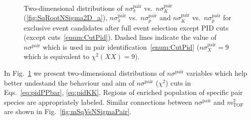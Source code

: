 \begin{figure}[h]
{  \begin{subfigure}[b]{\linewidth}\addtocounter{subfigure}{-2}\vspace*{-13pt}
  \end{subfigure}\\
  \begin{minipage}[t][1.042\linewidth][t]{\linewidth}\vspace{10pt}
    \caption[$n\sigma^{\text{pair}}_{X}$ vs. $n\sigma^{\text{pair}}_{Y}$.]{Two-dimensional distributions of $n\sigma^{\text{pair}}_{\pi}$ vs.~$n\sigma^{\text{pair}}_{K}$ (\ref{fig:SqRootNSigma2D_a}), $n\sigma^{\text{pair}}_{\pi}$ vs.~$n\sigma^{\text{pair}}_{p}$ and $n\sigma^{\text{pair}}_{K}$ vs.~$n\sigma^{\text{pair}}_{p}$ for exclusive event candidates after full event selection except PID cuts (except cuts~\ref{enum:CutPid}). Dashed lines indicate the value of $n\sigma^{\text{pair}}$ which is used in pair identification~\ref{enum:CutPid} ($n\sigma^{\text{pair}}_{X}=9$ which is equivalent to $\chi^{2}(XX)=9$).}\label{fig:SqRootNSigma2D}
  \end{minipage}
}%

\end{figure}


In Fig.~\ref{fig:SqRootNSigma2D} we present two-dimensional distributions of $n\sigma^{\text{pair}}$ variables which help better undestand the behaviour and aim of $n\sigma^{\text{pair}}$ ($\chi^{2}$) cuts in Eqs.~\eqref{eq:pidPPbar}, \eqref{eq:pidKK}. Regions of enriched population of specific pair species are appropriately labeled. Similar connections between $n\sigma^{\text{pair}}$ and $m^{2}_{\text{TOF}}$ are shown in Fig.~\ref{fig:mSqVsNSigmaPair}.
 


